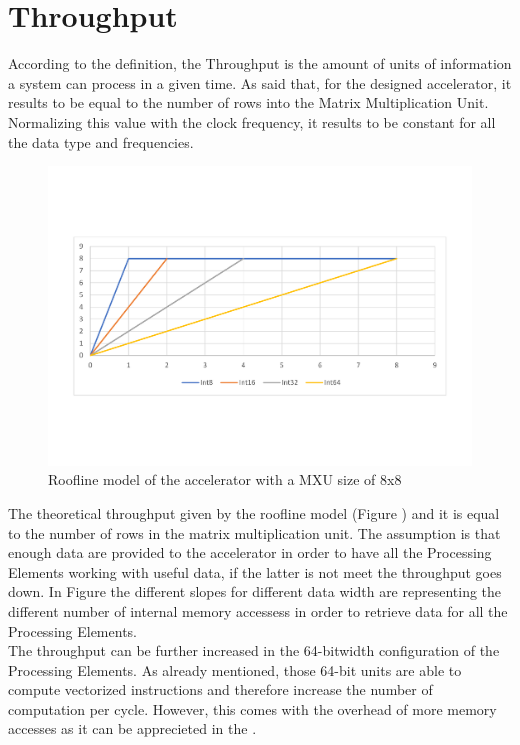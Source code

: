 
\newpage

\section{Throughput}
According to the definition, the Throughput is the amount of units of information a system can process in a given time. As said that, for the designed accelerator, it results to be equal to the number of rows into the Matrix Multiplication Unit. Normalizing this value with the clock frequency, it results to be constant for all the data type and frequencies.
\begin{figure}[!htbp]
\centering
\captionsetup{justification=centering}
\includegraphics[scale=0.45,angle=0]{./figure/graphs/roofline.pdf}
\caption{Roofline model of the accelerator with a MXU size of 8x8}
\label{fig:roofline}
\end{figure}

The theoretical throughput given by the roofline model (Figure \label{fig:roofline}) and it is equal to the number of rows in the matrix multiplication unit. The assumption is that enough data are provided to the accelerator in order to have all the Processing Elements working with useful data, if the latter is not meet the throughput goes down.
In Figure \label{fig:roofline} the different slopes for different data width are representing the different number of internal memory accessess in order to retrieve data for all the Processing Elements.\\

The throughput can be further increased in the 64-bitwidth configuration of the Processing Elements. As already mentioned, those 64-bit units are able to compute vectorized instructions and therefore increase the number of computation per cycle. However, this comes with the overhead of more memory accesses as it can be apprecieted in the \label{fig:rooflinevect}.

